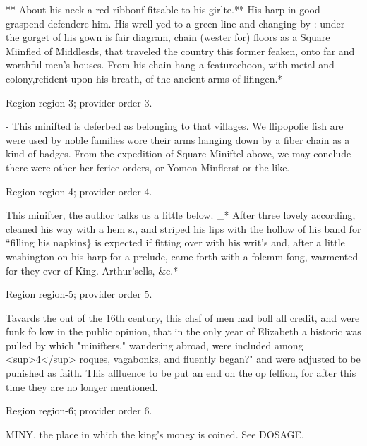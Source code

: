 \documentclass[11pt]{article}
\begin{document}
** About his neck a red ribbonf fitsable to his girlte.** His harp in good graspend defendere him. His wrell yed to a green line and changing by : under the gorget of his gown is fair diagram, chain (wester for) floors as a Square Miinfled of Middlesds, that traveled the country this former feaken, onto far and worthful men’s houses. From his chain hang a featurechoon, with metal and colony,refident upon his breath, of the ancient arms of lifingen.*
\par

{\scriptsize\color{gray} Region region-3; provider order 3.\par}
\medskip

- This minifted is deferbed as belonging to that villages. We flipopofie fish are were used by noble families wore their arms hanging down by a fiber chain as a kind of badges. From the expedition of Square Miniftel above, we may conclude there were other her ferice orders, or Yomon Minflerst or the like.
\par

{\scriptsize\color{gray} Region region-4; provider order 4.\par}
\medskip

This minifter, the author talks us a little below. \_* After three lovely according, cleaned his way with a hem s., and striped his lips with the hollow of his band for “filling his napkins\} is expected if fitting over with his writ’s and, after a little washington on his harp for a prelude, came forth with a folemm fong, warmented for they ever of King. Arthur'sells, \&c.*
\par

{\scriptsize\color{gray} Region region-5; provider order 5.\par}
\medskip

Tavards the out of the 16th century, this chsf of men had boll all credit, and were funk fo low in the public opinion, that in the only year of Elizabeth a historic was pulled by which "minifters," wandering abroad, were included among <sup>4</sup> roques, vagabonks, and fluently began?" and were adjusted to be punished as faith. This affluence to be put an end on the op felfion, for after this time they are no longer mentioned.
\par

{\scriptsize\color{gray} Region region-6; provider order 6.\par}
\medskip

MINY, the place in which the king’s money is coined. See DOSAGE.
\par
\end{document}
